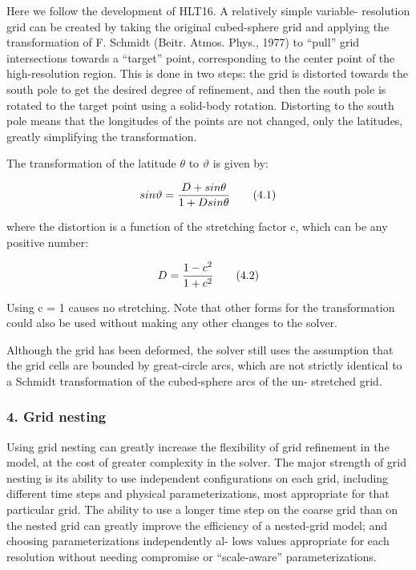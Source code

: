 Here we follow the development of H\+L\+T16. A relatively simple variable-\/ resolution grid can be created by taking the original cubed-\/sphere grid and applying the transformation of F. Schmidt (Beitr. Atmos. Phys., 1977) to “pull” grid intersections towards a “target” point, corresponding to the center point of the high-\/resolution region. This is done in two steps\+: the grid is distorted towards the south pole to get the desired degree of refinement, and then the south pole is rotated to the target point using a solid-\/body rotation. Distorting to the south pole means that the longitudes of the points are not changed, only the latitudes, greatly simplifying the transformation.

The transformation of the latitude {$\theta$} to {$\vartheta$} is given by\+:

\[ sin\vartheta = \frac{D + sin\theta}{1 + Dsin\theta} \\ \tag {4.1} \]

where the distortion is a function of the stretching factor c, which can be any positive number\+:

\[ D = \frac{1 - c^2}{1 + c^2} \\ \tag {4.2} \]

Using c = 1 causes no stretching. Note that other forms for the transformation could also be used without making any other changes to the solver.

Although the grid has been deformed, the solver still uses the assumption that the grid cells are bounded by great-\/circle arcs, which are not strictly identical to a Schmidt transformation of the cubed-\/sphere arcs of the un-\/ stretched grid.

\subsubsection*{4. Grid nesting}

Using grid nesting can greatly increase the flexibility of grid refinement in the model, at the cost of greater complexity in the solver. The major strength of grid nesting is its ability to use independent configurations on each grid, including different time steps and physical parameterizations, most appropriate for that particular grid. The ability to use a longer time step on the coarse grid than on the nested grid can greatly improve the efficiency of a nested-\/grid model; and choosing parameterizations independently al-\/ lows values appropriate for each resolution without needing compromise or “scale-\/aware” parameterizations.

